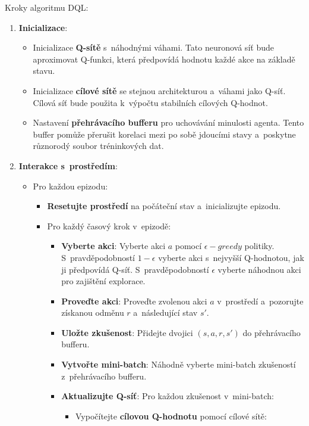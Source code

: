 Kroky algoritmu DQL:
\begin{enumerate}
    \item \textbf{Inicializace}:
    \begin{itemize}
        \item Inicializace \textbf{Q-sítě} s~náhodnými váhami. Tato neuronová síť bude aproximovat Q-funkci, která předpovídá hodnotu každé akce na základě stavu.
        \item Inicializace \textbf{cílové sítě} se stejnou architekturou a~váhami jako Q-síť. Cílová síť bude použita k~výpočtu stabilních cílových Q-hodnot.
        \item Nastavení \textbf{přehrávacího bufferu} pro uchovávání minulosti agenta. Tento buffer pomůže přerušit korelaci mezi po sobě jdoucími stavy a~poskytne různorodý soubor tréninkových dat.
    \end{itemize}
    \item \textbf{Interakce s~prostředím}:
    \begin{itemize}
        \item Pro každou epizodu:
        \begin{itemize}
            \item \textbf{Resetujte prostředí} na počáteční stav a~inicializujte epizodu.
            \item Pro každý časový krok v~epizodě:
            \begin{itemize}
                \item \textbf{Vyberte akci}: Vyberte akci $a$ pomocí $\epsilon-greedy$ politiky. S~pravděpodobností $1 - \epsilon$ vyberte akci s~nejvyšší Q-hodnotou, jak ji předpovídá Q-síť. S~pravděpodobností $\epsilon$ vyberte náhodnou akci pro zajištění explorace.
                \item \textbf{Proveďte akci}: Proveďte zvolenou akci $a$ v~prostředí a~pozorujte získanou odměnu $r$ a~následující stav $s'$.
                \item \textbf{Uložte zkušenost}: Přidejte dvojici $(s, a, r, s')$ do přehrávacího bufferu.
                \item \textbf{Vytvořte mini-batch}: Náhodně vyberte mini-batch zkušeností z~přehrávacího bufferu.
                \item \textbf{Aktualizujte Q-síť}: Pro každou zkušenost v~mini-batch:
                \begin{itemize}
                    \item Vypočítejte \textbf{cílovou Q-hodnotu} pomocí cílové sítě:
                    \[
\]
\end{itemize}
\end{itemize}
\end{itemize}
\end{itemize}
\end{enumerate}
